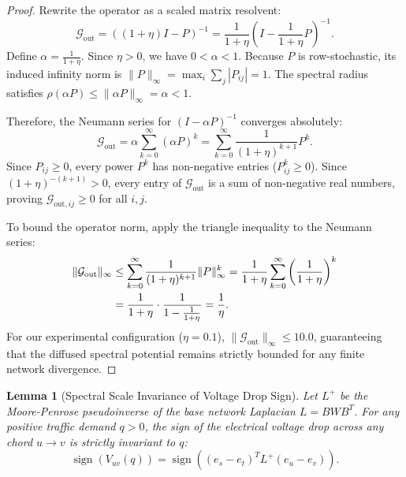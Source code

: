 \documentclass[11pt,a4paper]{article}
\newtheorem{lemma}{Lemma}
\begin{document}
\begin{proof}
Rewrite the operator as a scaled matrix resolvent:
\begin{equation}
\mathcal{G}_{\text{out}} = \left( (1 + \eta) I - P \right)^{-1} = \frac{1}{1 + \eta} \left( I - \frac{1}{1 + \eta} P \right)^{-1}.
\end{equation}
Define $\alpha = \frac{1}{1 + \eta}$. Since $\eta > 0$, we have $0 < \alpha < 1$. Because $P$ is row-stochastic, its induced infinity norm is $\|P\|_\infty = \max_i \sum_j |P_{ij}| = 1$. The spectral radius satisfies $\rho(\alpha P) \le \|\alpha P\|_\infty = \alpha < 1$.

Therefore, the Neumann series for $(I - \alpha P)^{-1}$ converges absolutely:
\begin{equation}
\mathcal{G}_{\text{out}} = \alpha \sum_{k=0}^\infty (\alpha P)^k = \sum_{k=0}^\infty \frac{1}{(1 + \eta)^{k+1}} P^k.
\end{equation}
Since $P_{ij} \ge 0$, every power $P^k$ has non-negative entries ($P^k_{ij} \ge 0$). Since $(1+\eta)^{-(k+1)} > 0$, every entry of $\mathcal{G}_{\text{out}}$ is a sum of non-negative real numbers, proving $\mathcal{G}_{\text{out}, ij} \ge 0$ for all $i, j$.

To bound the operator norm, apply the triangle inequality to the Neumann series:
\begin{align}
\|\mathcal{G}_{\text{out}}\|_\infty &\le \sum_{k=0}^\infty \frac{1}{(1 + \eta)^{k+1}} \|P\|_\infty^k = \frac{1}{1 + \eta} \sum_{k=0}^\infty \left( \frac{1}{1 + \eta} \right)^k \notag \\
&= \frac{1}{1 + \eta} \cdot \frac{1}{1 - \frac{1}{1 + \eta}} = \frac{1}{\eta}.
\end{align}
For our experimental configuration ($\eta = 0.1$), $\|\mathcal{G}_{\text{out}}\|_\infty \le 10.0$, guaranteeing that the diffused spectral potential remains strictly bounded for any finite network divergence.
\end{proof}

\begin{lemma}[Spectral Scale Invariance of Voltage Drop Sign]
\label{lem:scale_invariance}
Let $L^+$ be the Moore-Penrose pseudoinverse of the base network Laplacian $L = B W B^T$. For any positive traffic demand $q > 0$, the sign of the electrical voltage drop across any chord $u \to v$ is strictly invariant to $q$:
\begin{equation}
\operatorname{sign}\left( V_{uv}(q) \right) = \operatorname{sign}\left( (e_s - e_t)^T L^+ (e_u - e_v) \right).
\end{equation}
\end{lemma}
\end{document}
